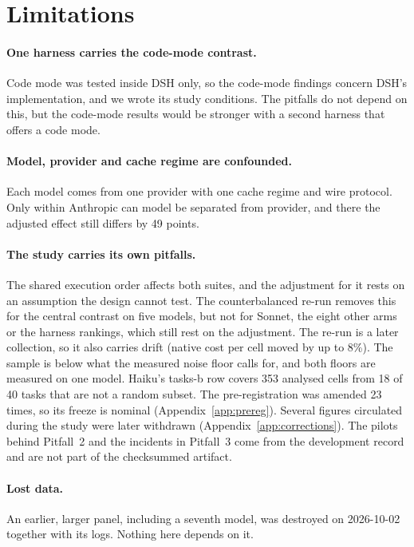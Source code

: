 \documentclass[10pt]{article}
\begin{document}
\section{Limitations}\label{sec:limitations}

\paragraph{One harness carries the code-mode contrast.} Code mode was tested inside DSH only, so the
code-mode findings concern DSH's implementation, and we wrote its study conditions. The pitfalls do not
depend on this, but the code-mode results would be stronger with a second harness that offers a code
mode.

\paragraph{Model, provider and cache regime are confounded.} Each model comes from one provider with
one cache regime and wire protocol. Only within Anthropic can model be separated from provider, and
there the adjusted effect still differs by 49 points.

\paragraph{The study carries its own pitfalls.} The shared execution order affects both suites, and the
adjustment for it rests on an assumption the design cannot test. The counterbalanced re-run removes
this for the central contrast on five models, but not for Sonnet, the eight other arms or the
harness rankings, which still rest on the adjustment. The re-run is a later collection, so it also
carries drift (native cost per cell moved by up to 8\%). The sample
is below what the measured noise floor calls for, and both floors are measured on one model. Haiku's tasks-b row covers 353 analysed cells from 18 of 40 tasks that are not a random subset. The
pre-registration was amended 23 times, so its freeze is nominal (Appendix~\ref{app:prereg}). Several
figures circulated during the study were later withdrawn (Appendix~\ref{app:corrections}). The pilots
behind Pitfall~2 and the incidents in Pitfall~3 come from the development record and are not part of
the checksummed artifact.

\paragraph{Lost data.} An earlier, larger panel, including a seventh model, was destroyed on 2026-10-02
together with its logs. Nothing here depends on it.
\end{document}
